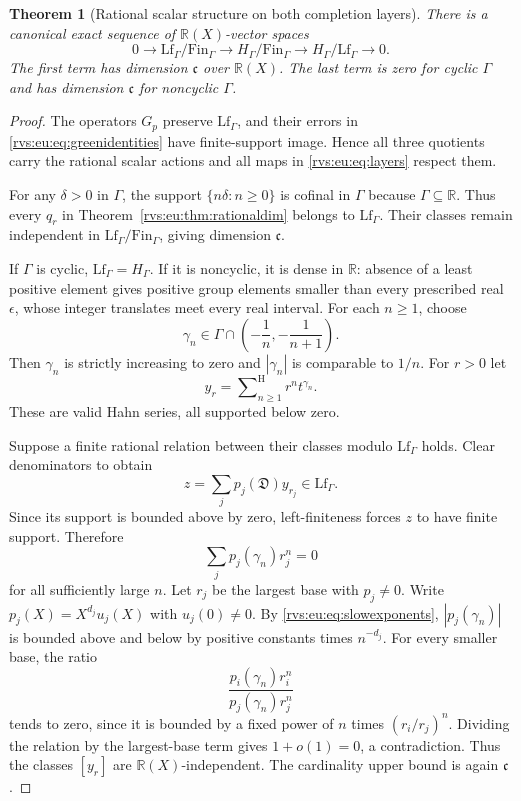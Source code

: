 \documentclass[11pt,letterpaper]{article}
\numberwithin{equation}{section}
\newtheorem{theorem}{Theorem}[section]
\theoremstyle{definition}
\theoremstyle{remark}
\newcommand{\R}{\mathbb{R}}
\newcommand{\ct}{\operatorname{ct}}
\newcommand{\hSum}{\mathop{\sum}\nolimits^{\mathrm H}}
\newcommand{\cont}{\mathfrak c}%
\newcommand{\EuD}{\mathfrak D}%
\newcommand{\FinS}[1]{\mathrm{Fin}_{#1}}%
\newcommand{\LfS}[1]{\mathrm{Lf}_{#1}}%
\begin{document}
\begin{theorem}[Rational scalar structure on both completion layers]\label{rvs:eu:thm:layerstructure}
There is a canonical exact sequence of $\R(X)$-vector spaces
\begin{equation}\label{rvs:eu:eq:layers}
 0\longrightarrow \LfS{\Gamma}/\FinS{\Gamma}
 \longrightarrow H_\Gamma/\FinS{\Gamma}
 \longrightarrow H_\Gamma/\LfS{\Gamma}\longrightarrow0.
\end{equation}
The first term has dimension $\cont$ over $\R(X)$. The last term is zero for cyclic $\Gamma$ and has dimension $\cont$ for noncyclic $\Gamma$.
\end{theorem}
\begin{proof}
The operators $G_p$ preserve $\LfS{\Gamma}$, and their errors in \eqref{rvs:eu:eq:greenidentities} have finite-support image. Hence all three quotients carry the rational scalar actions and all maps in \eqref{rvs:eu:eq:layers} respect them.

For any $\delta>0$ in $\Gamma$, the support $\{n\delta:n\ge0\}$ is cofinal in $\Gamma$ because $\Gamma\subseteq\R$. Thus every $q_r$ in Theorem~\ref{rvs:eu:thm:rationaldim} belongs to $\LfS{\Gamma}$. Their classes remain independent in $\LfS{\Gamma}/\FinS{\Gamma}$, giving dimension $\cont$.

If $\Gamma$ is cyclic, $\LfS{\Gamma}=H_\Gamma$. If it is noncyclic, it is dense in $\R$: absence of a least positive element gives positive group elements smaller than every prescribed real $\epsilon$, whose integer translates meet every real interval. For each $n\ge1$, choose
\begin{equation}\label{rvs:eu:eq:slowexponents}
 \gamma_n\in\Gamma\cap\left(-\frac1n,-\frac1{n+1}\right).
\end{equation}
Then $\gamma_n$ is strictly increasing to zero and $|\gamma_n|$ is comparable to $1/n$. For $r>0$ let
\[
 y_r=\hSum_{n\ge1}r^n t^{\gamma_n}.
\]
These are valid Hahn series, all supported below zero.

Suppose a finite rational relation between their classes modulo $\LfS{\Gamma}$ holds. Clear denominators to obtain
\[
 z=\sum_jp_j(\EuD)y_{r_j}\in \LfS{\Gamma}.
\]
Since its support is bounded above by zero, left-finiteness forces $z$ to have finite support. Therefore
\[
 \sum_jp_j(\gamma_n)r_j^n=0
\]
for all sufficiently large $n$. Let $r_j$ be the largest base with $p_j\ne0$. Write $p_j(X)=X^{d_j}u_j(X)$ with $u_j(0)\ne0$. By \eqref{rvs:eu:eq:slowexponents}, $|p_j(\gamma_n)|$ is bounded above and below by positive constants times $n^{-d_j}$. For every smaller base, the ratio
\[
 \frac{p_i(\gamma_n)r_i^n}{p_j(\gamma_n)r_j^n}
\]
tends to zero, since it is bounded by a fixed power of $n$ times $(r_i/r_j)^n$. Dividing the relation by the largest-base term gives $1+o(1)=0$, a contradiction. Thus the classes $[y_r]$ are $\R(X)$-independent. The cardinality upper bound is again $\cont$.
\end{proof}
\end{document}
